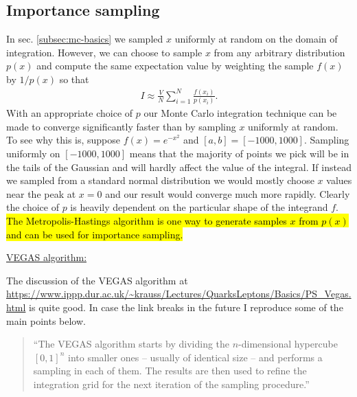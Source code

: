 \vspace{7px}
\subsection{Importance sampling}\label{subsec:mc-importance-sampling}
In sec. \ref{subsec:mc-basics} we sampled $x$ uniformly at random on the domain of integration. However, we can choose to sample $x$ from any arbitrary distribution $p(x)$ and compute the same expectation value by weighting the sample $f(x)$ by $1 / p(x)$ so that
\begin{align}
    I \approx \frac{V}{N}\sum_{i=1}^{N} \frac{f(x_i)}{p(x_i)}.
\end{align}
With an appropriate choice of $p$ our Monte Carlo integration technique can be made to converge significantly faster than by sampling $x$ uniformly at random. 
To see why this is, suppose $f(x) = e^{-x^2}$ and $[a,b] = [-1000, 1000]$. 
Sampling uniformly on $[-1000, 1000]$ means that the majority of points we pick will be in the tails of the Gaussian and will hardly affect the value of the integral. 
If instead we sampled from a standard normal distribution we would mostly choose $x$ values near the peak at $x = 0$ and our result would converge much more rapidly.
Clearly the choice of $p$ is heavily dependent on the particular shape of the integrand $f$. 
\hl{The Metropolis-Hastings algorithm is one way to generate samples $x$ from $p(x)$ and can be used for importance sampling.}

\underline{VEGAS algorithm:}

The discussion of the VEGAS algorithm at \url{https://www.ippp.dur.ac.uk/~krauss/Lectures/QuarksLeptons/Basics/PS_Vegas.html} is quite good. In case the link breaks in the future I reproduce some of the main points below.
\begin{quotation}
    ``The VEGAS algorithm starts by dividing the $n$-dimensional hypercube $[0,1]^n$ into smaller ones -- usually of identical size -- and performs a sampling in each of them. 
    The results are then used to refine the integration grid for the next iteration of the sampling procedure.''
\end{quotation}
